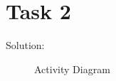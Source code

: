 \chapter{Task 2}
\begin{parlist}
	\item Solution:
	\begin{figure}[hbt]
  \caption{Activity Diagram}
  \label{fig:ActDia}
\end{figure}

\end{parlist}
    